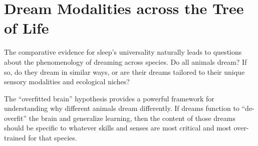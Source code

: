 \section{Dream Modalities across the Tree of Life}\label{sec:comparison}

The comparative evidence for sleep's universality naturally leads to questions about the phenomenology of dreaming across species. Do all animals dream? If so, do they dream in similar ways, or are their dreams tailored to their unique sensory modalities and ecological niches?

The ``overfitted brain'' hypothesis provides a powerful framework for understanding why different animals dream differently. If dreams function to ``de-overfit'' the brain and generalize learning, then the content of those dreams should be specific to whatever skills and senses are most critical and most over-trained for that species.

